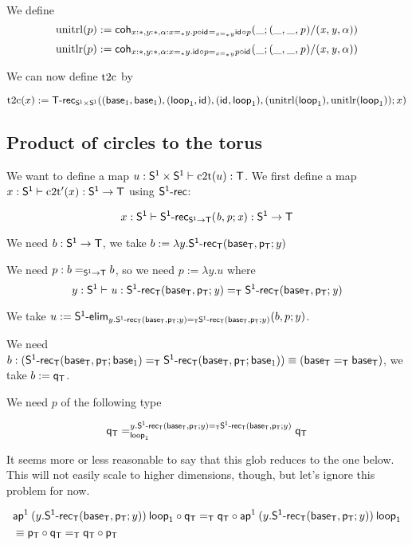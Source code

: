 We define
\[\unitrl(p):=\coh{x:\diagbase,y:\diagbase,\alpha:\homj{\diagbase}xy.
  \homj{\homj{\diagbase}xy}{p\circ\id{}}{\id{}\circ p}}{\_}
{(\_,\_,p)/(x,y,\alpha)}\]
\[\unitlr(p):=\coh{x:\diagbase,y:\diagbase,\alpha:\homj{\diagbase}xy.
  \homj{\homj{\diagbase}xy}{\id{}\circ p}{p\circ\id{}}}{\_}
{(\_,\_,p)/(x,y,\alpha)}\]

We can now define $\ttoc$ by

\[\ttoc(x):=\dsd{T\text{-}rec}_{\PP}((\base{1},\base{1}),(\lp{1},\id{})
,(\id{},\lp{1}),(\unitrl(\lp{1}),\unitlr(\lp{1}));x)\]

\subsection{Product of circles to the torus}

We want to define a map $u:\PP\vdash\ctot(u):\dsd{T}$. We first define a map
$x:\dsd{S^1}\vdash\ctot'(x):\dsd{S^1}\to\dsd{T}$ using $\dsd{S^1\text{-}rec}$:

\[\ofglob{x:\dsd{S^1}}{\dsd{S^1\text{-}rec}_{\dsd{S^1}\to\dsd{T}}(b,p;x)}
{\dsd{S^1}\to\dsd{T}}\]

We need $b:\dsd{S^1}\to\dsd{T}$, we take
$b:=\lambda{}y.\dsd{S^1\text{-}rec}_{\dsd{T}}(\baseT,\pT;y)$

We need $p:\homj{\dsd{S^1}\to\dsd{T}}{b}{b}$, so we need $p:=\lambda y.u$ where
\[\ofglob{y:\dsd{S^1}}{u}{\homj{\dsd{T}}
  {\dsd{S^1\text{-}rec}_{\dsd{T}}(\baseT,\pT;y)}
  {\dsd{S^1\text{-}rec}_{\dsd{T}}(\baseT,\pT;y)}}\]

We take $u:=\dsd{S^1\text{-}elim}_{y.\homj{\dsd{T}}
  {\dsd{S^1\text{-}rec}_{\dsd{T}}(\baseT,\pT;y)}
  {\dsd{S^1\text{-}rec}_{\dsd{T}}(\baseT,\pT;y)}}(b,p;y)$.

We need $b:(\homj{\dsd{T}}
{\dsd{S^1\text{-}rec}_{\dsd{T}}(\baseT,\pT;\base{1})}
{\dsd{S^1\text{-}rec}_{\dsd{T}}(\baseT,\pT;\base{1})})
\equiv(\homj{\dsd{T}}{\baseT}{\baseT})$, we take $b:=\qT$.

We need $p$ of the following type

\[\dhomj{y.\homj{\dsd{T}}
  {\dsd{S^1\text{-}rec}_{\dsd{T}}(\baseT,\pT;y)}
  {\dsd{S^1\text{-}rec}_{\dsd{T}}(\baseT,\pT;y)}}{\qT}{\qT}{\lp{1}}\]

It seems more or less reasonable to say that this glob reduces to the one
below. This will not easily scale to higher dimensions, though, but let’s
ignore this problem for now.

\begin{align*}
  &\homj{\dsd{T}}{\apn{1}{(y.\dsd{S^1\text{-}rec}_{\dsd{T}}(\baseT,\pT;y))}
    {\lp{1}}\circ\qT}
  {\qT\circ\apn{1}{(y.\dsd{S^1\text{-}rec}_{\dsd{T}}(\baseT,\pT;y))} {\lp{1}}}
  \\
  &\equiv \homj{\dsd{T}}{\pT\circ\qT}{\qT\circ\pT}
\end{align*}

